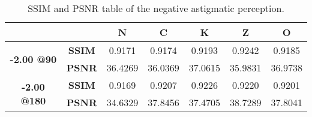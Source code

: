 
\begin{table}[!b]
	\centering
	\label{table:metrics_astig-2}
	\caption[SSIM and PSNR table of the negative astigmatic perception]{SSIM and PSNR table of the negative astigmatic perception.}
	\begin{tabular}{ccccccc}
	\hline
	{\bf }                                                 & {\bf }                          & {\bf N} & {\bf C} & {\bf K} & {\bf Z} & {\bf O} \\ \hline
	\multicolumn{1}{c|}{\multirow{2}{*}{{\bf -2.00 @90}}}  & \multicolumn{1}{c|}{{\bf SSIM}} & 0.9171  & 0.9174  & 0.9193  & 0.9242  & 0.9185  \\
	\multicolumn{1}{c|}{}                                  & \multicolumn{1}{c|}{{\bf PSNR}} & 36.4269 & 36.0369 & 37.0615 & 35.9831 & 36.9738 \\ \hline
	\multicolumn{1}{c|}{\multirow{2}{*}{{\bf -2.00 @180}}} & \multicolumn{1}{c|}{{\bf SSIM}} & 0.9169  & 0.9207  & 0.9226  & 0.9220  & 0.9201  \\
	\multicolumn{1}{c|}{}                                  & \multicolumn{1}{c|}{{\bf PSNR}} & 34.6329 & 37.8456 & 37.4705 & 38.7289 & 37.8041 \\ \hline
	\end{tabular}

\end{table}